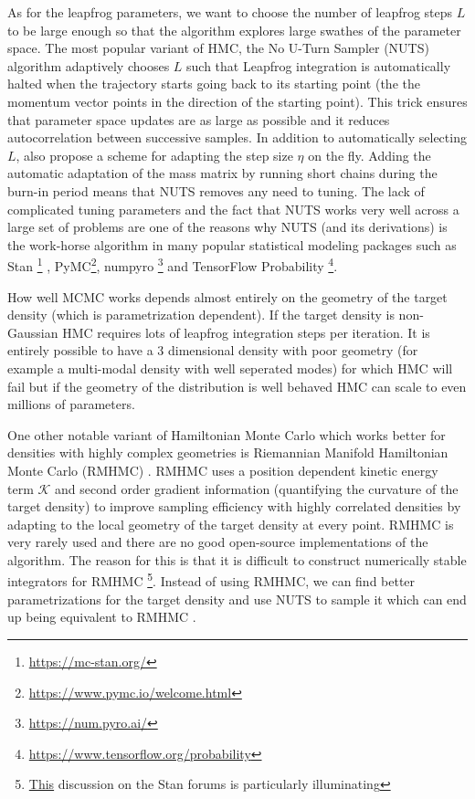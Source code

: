\documentclass[12pt,dvipsnames]{report}
\newcommand{\ssf}[1]{\textsf{#1}}
\begin{document}
As for the leapfrog parameters, we want to choose the number of leapfrog steps $L$ to be 
large enough so that the algorithm explores large swathes of the parameter space.
The most popular variant of HMC, the No U-Turn Sampler (NUTS) algorithm 
\citep{arXiv:1111.4246} adaptively chooses $L$ such that Leapfrog integration is 
automatically halted when the trajectory starts going back to its starting point (the
the momentum vector points in the direction of the starting point).
This trick ensures that parameter space updates are as large as possible and it 
reduces autocorrelation between successive samples.
In addition to automatically selecting $L$, \citet{arXiv:1111.4246} also propose a 
scheme for adapting the step size $\eta$ on the fly. Adding the automatic adaptation
of the mass matrix by running short chains during the burn-in period means that 
NUTS removes any need to tuning. The lack of complicated tuning parameters and 
the fact that NUTS works very well across a large set of problems are one of the 
reasons why NUTS (and its derivations) is the work-horse algorithm 
in many popular statistical modeling packages such as \ssf{Stan}
\footnote{\url{https://mc-stan.org/}} \citep{2017JSS....76....1C}, 
\ssf{PyMC}\footnote{\url{https://www.pymc.io/welcome.html}}, \ssf{numpyro}
\footnote{\url{https://num.pyro.ai/}} and \ssf{TensorFlow Probability}
\footnote{\url{https://www.tensorflow.org/probability}}. 

How well MCMC works depends almost entirely on the geometry of the target density
(which is parametrization dependent). If the target density is non-Gaussian 
HMC requires lots of leapfrog integration steps per iteration. It is entirely 
possible to have a 3 dimensional density with poor geometry (for example 
a multi-modal density with well seperated modes) for which HMC will 
fail but if the geometry of the distribution is well behaved HMC can scale to 
even millions of parameters.


One other notable variant of Hamiltonian Monte Carlo which works better for 
densities with highly complex geometries is 
Riemannian Manifold Hamiltonian Monte Carlo (RMHMC) \citep{girolami2011}.
RMHMC uses a position dependent kinetic energy term $\mathcal{K}$ and second order 
gradient information (quantifying the curvature of the target density) to improve 
sampling efficiency with highly correlated densities by adapting to the local geometry 
of the target density at every point. RMHMC is very rarely used and there are no 
good open-source implementations of the algorithm. The reason for this is that 
it is  difficult to construct numerically stable integrators for RMHMC
\footnote{\href{https://discourse.mc-stan.org/t/riemann-manifold-hmc-in-stan/19466/5}{This}
discussion on the \ssf{Stan} forums is particularly illuminating}.
Instead of using RMHMC, we can find better parametrizations for the target density
and use NUTS to sample it which can end up being equivalent to RMHMC 
\citep{arXiv:1910.09407}.
\end{document}
